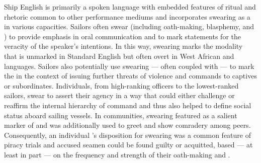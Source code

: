 Ship English is primarily a spoken language with embedded features of ritual and rhetoric common to other performance mediums and incorporates swearing as a  in various capacities. Sailors often swear (including oath-making, blasphemy, and ) to provide emphasis in oral communication and to mark statements for the veracity of the speaker’s intentions. In this way, swearing marks the  modality that is unmarked in Standard English but often overt in West African and  languages. Sailors also potentially use swearing — often coupled with  — to mark the  in the context of issuing further threats of violence and commands to captives or subordinates. Individuals, from {high-ranking officers to the lowest-ranked sailors}, swear to assert their agency in a way that could either challenge or reaffirm the internal hierarchy of command and thus also helped to define social status aboard sailing vessels. In  communities, swearing featured as a salient marker of  and was additionally used to greet and show comradery among peers.  Consequently, an individual ’s disposition for swearing was a common feature of piracy trials and accused seamen could be found guilty or acquitted, based — at least in part — on the frequency and strength of their oath-making and . 


